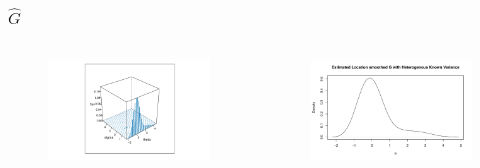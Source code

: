 \documentclass[10pt,mathserif]{beamer}
\begin{document}
\begin{frame}
  \frametitle{ $\hat{G}$}
  \begin{columns}[T,onlytextwidth]
    \begin{figure}
      \centering
      \includegraphics[width=\textwidth]{../../Figures/2013-2022/GMM/GLVmix_s.pdf}
    \end{figure}

    \begin{figure}
      \centering
      \includegraphics[width=\textwidth]{../../Figures/2013-2022/GMM/GLmix_s.pdf}
    \end{figure}
  \end{columns}
\end{frame}
\end{document}
